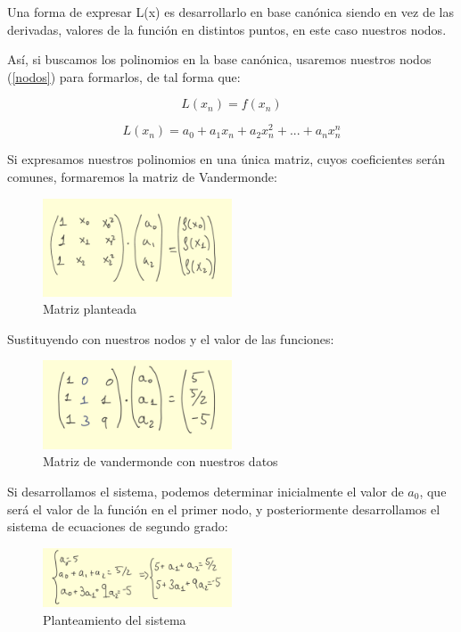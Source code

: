 \documentclass{article}
\begin{document}
Una forma de expresar L(x) es desarrollarlo en base canónica siendo en vez de las derivadas, valores de la función en distintos puntos, en este caso nuestros nodos.

Así, si buscamos los polinomios en la base canónica, usaremos nuestros nodos (\ref{nodos}) para formarlos, de tal forma que:

\begin{equation}
  L(x_{n}) = f(x_{n})
\end{equation}

\begin{equation}
  L(x_{n}) = a_{0} + a_{1}x_{n} + a_{2}x_{n}^{2} + ... + a_{n}x_{n}^{n}
\end{equation}

Si expresamos nuestros polinomios en una única matriz, cuyos coeficientes serán comunes, formaremos la matriz de Vandermonde:


\begin{figure}[ht]
	\center
	\includegraphics[width=0.5\textwidth]{src/vandermatriz.jpg}
	\caption{Matriz planteada}
\end{figure}

\newpage

Sustituyendo con nuestros nodos y el valor de las funciones:

\begin{figure}[ht]
	\center
	\includegraphics[width=0.5\textwidth]{src/matrizdatos.jpg}
	\caption{Matriz de vandermonde con nuestros datos}
\end{figure}


Si desarrollamos el sistema, podemos determinar inicialmente el valor de $a_{0}$, que será el valor de la función en el primer nodo, y posteriormente desarrollamos el sistema de ecuaciones de segundo grado:

\begin{figure}[ht]
	\center
	\includegraphics[width=0.5\textwidth]{src/sistemaplanteado.jpg}
	\caption{Planteamiento del sistema}
\end{figure}
\end{document}

